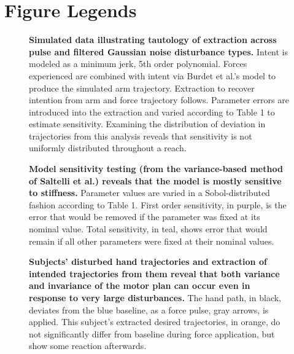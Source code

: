 
%
%
% 
\pagebreak
\section*{Figure Legends}
%
\begin{figure}
\caption{
{\bf Simulated data illustrating tautology of extraction across pulse and filtered Gaussian noise disturbance types.} Intent is modeled as a minimum jerk, 5th order polynomial. Forces experienced are combined with intent via Burdet et al.'s \cite{burdet2006stability} model to produce the simulated arm trajectory. Extraction to recover intention from arm and force trajectory follows. Parameter errors are introduced into the extraction and varied according to Table 1 to estimate sensitivity. Examining the distribution of deviation in trajectories from this analysis reveals that sensitivity is not uniformly distributed throughout a reach.
}
\label{fig:synthetic}
\end{figure}

\begin{figure}
\caption{
{\bf Model sensitivity testing (from the variance-based method of Saltelli et al.\cite{saltelli2010variance}) reveals that the model is mostly sensitive to stiffness.} Parameter values are varied in a Sobol-distributed fashion according to Table 1. First order sensitivity, in purple, is the error that would be removed if the parameter was fixed at its nominal value. Total sensitivity, in teal, shows error that would remain if all other parameters were fixed at their nominal values.
}
\label{fig:sensitivity}
\end{figure}

\begin{figure}
\caption{
{\bf Subjects' disturbed hand trajectories and extraction of intended trajectories from them reveal that both variance and invariance of the motor plan can occur even in response to very large disturbances.} The hand path, in black, deviates from the blue baseline, as a force pulse, gray arrows, is applied. This subject's extracted desired trajectories, in orange, do not significantly differ from baseline during force application, but show some reaction afterwards.
}
\label{fig:anecdotes}
\end{figure}


